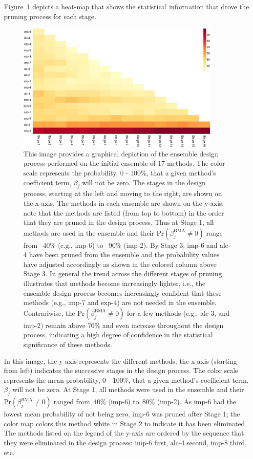 \documentclass[journal=jpcbfk, manuscript=article]{achemso}
\newcommand{\+}[1]{\ensuremath{\mathbf{#1}}}
\begin{document}
Figure~\ref{Analysis:Figure3:P-not} depicts a heat-map that shows the statistical information that drove the pruning process for each stage.
\begin{figure}[h!]
	\centering
	\includegraphics[keepaspectratio,width=0.9\textwidth]{Figures/Rev2/P_Not_Zero_Per_Stage2}
	\caption{This image provides a graphical depiction of the ensemble design process performed on the initial ensemble of 17 methods.
	The color scale represents the probability, 0 - 100\%, that a given method's coefficient term, $\beta_j$ will not be zero.
	The stages in the design process, starting at the left and moving to the right, are shown on the x-axis.
	The methods in each ensemble are shown on the y-axis; note that the methods are listed (from top to bottom) in the order that they are pruned in the design process.
	Thus at Stage 1, all methods are used in the ensemble and their $\mathrm{Pr}(\beta_j^{\text{BMA}}\neq 0) $ range from ~40\% (e.g., imp-6) to ~90\% (imp-2).
	By Stage 3, imp-6 and alc-4 have been pruned from the ensemble and the probability values have adjusted accordingly as shown in the colored column above Stage 3.
	In general the trend across the different stages of pruning illustrates that methods become increasingly lighter, i.e., the ensemble design process becomes increasingly confident that these methods (e.g., imp-7 and exp-4) are not needed in the ensemble.
	Contrariwise, the $\mathrm{Pr}(\beta_j^{\text{BMA}}\neq 0) $ for a few methods (e.g., alc-3, and imp-2) remain above 70\% and even increase throughout the design process, indicating a high degree of confidence in the statistical significance of these methods.}
	\label{Analysis:Figure3:P-not}
\end{figure}
In this image, the y-axis represents the different methods; the x-axis (starting from left) indicates the successive stages in the design process.
The color scale represents the mean probability, 0 - 100\%, that a given method's coefficient term, $\beta_j$ will not be zero.
At Stage 1, all methods were used in the ensemble and their $\mathrm{Pr}(\beta_j^{\text{BMA}}\neq 0)$ ranged from~40\% (imp-6) to~80\% (imp-2).
As imp-6 had the lowest mean probability of not being zero, imp-6 was pruned after Stage 1; the color map colors this method white in Stage 2 to indicate it has been eliminated.
The methods listed on the legend of the y-axis are  ordered by the sequence that they were eliminated in the design process: imp-6 first, alc-4 second, imp-8 third, etc.
\end{document}
